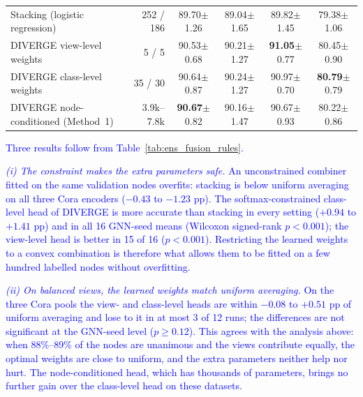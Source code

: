 \documentclass[a4paper,fleqn]{cas-sc}
\newcommand{\revtwo}[1]{\textcolor{blue}{#1}}  %
\begin{document}
\begin{table}[ht]
{\begin{tabular}{l r c c c c}
\hline
Stacking (logistic regression) & 252 / 186 & 89.70{\scriptsize$\pm$1.26} & 89.04{\scriptsize$\pm$1.65} & 89.82{\scriptsize$\pm$1.45} & 79.38{\scriptsize$\pm$1.06} \\
DIVERGE view-level weights & 5 / 5 & 90.53{\scriptsize$\pm$0.68} & 90.21{\scriptsize$\pm$1.27} & \textbf{91.05}{\scriptsize$\pm$0.77} & 80.45{\scriptsize$\pm$0.90} \\
DIVERGE class-level weights & 35 / 30 & 90.64{\scriptsize$\pm$0.87} & 90.24{\scriptsize$\pm$1.27} & 90.97{\scriptsize$\pm$0.70} & \textbf{80.79}{\scriptsize$\pm$0.79} \\
DIVERGE node-conditioned (Method~1) & 3.9k--7.8k & \textbf{90.67}{\scriptsize$\pm$0.82} & 90.16{\scriptsize$\pm$1.47} & 90.67{\scriptsize$\pm$0.93} & 80.22{\scriptsize$\pm$0.86} \\
\hline
\end{tabular}}
\end{table}

\revtwo{Three results follow from Table~\ref{tab:ens_fusion_rules}.}

\revtwo{\textit{(i) The constraint makes the extra parameters safe.} An unconstrained combiner fitted on the same validation nodes overfits: stacking is below uniform averaging on all three Cora encoders ($-0.43$ to $-1.23$ pp). The softmax-constrained class-level head of DIVERGE is more accurate than stacking in every setting ($+0.94$ to $+1.41$ pp) and in all 16 GNN-seed means (Wilcoxon signed-rank $p<0.001$); the view-level head is better in 15 of 16 ($p<0.001$). Restricting the learned weights to a convex combination is therefore what allows them to be fitted on a few hundred labelled nodes without overfitting.}

\revtwo{\textit{(ii) On balanced views, the learned weights match uniform averaging.} On the three Cora pools the view- and class-level heads are within $-0.08$ to $+0.51$ pp of uniform averaging and lose to it in at most 3 of 12 runs; the differences are not significant at the GNN-seed level ($p\geq0.12$). This agrees with the analysis above: when 88\%--89\% of the nodes are unanimous and the views contribute equally, the optimal weights are close to uniform, and the extra parameters neither help nor hurt. The node-conditioned head, which has thousands of parameters, brings no further gain over the class-level head on these datasets.}
\end{document}
